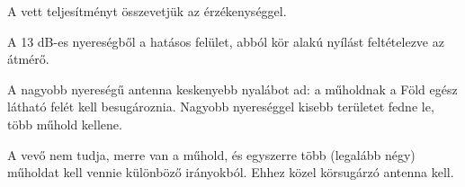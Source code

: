 \begin{center}\end{center}

\begin{center}\end{center}

A vett teljesítményt összevetjük az érzékenységgel.

\begin{center}\end{center}

\begin{center}\end{center}

A 13 dB-es nyereségből a hatásos felület, abból kör alakú nyílást feltételezve az átmérő.

\begin{center}\end{center}

\begin{center}\end{center}

\begin{center}\end{center}

A nagyobb nyereségű antenna keskenyebb nyalábot ad: a műholdnak a Föld egész látható felét kell besugároznia. Nagyobb nyereséggel kisebb területet fedne le, több műhold kellene.

A vevő nem tudja, merre van a műhold, és egyszerre több (legalább négy) műholdat kell vennie különböző irányokból. Ehhez közel körsugárzó antenna kell.
\begin{eredmeny}

\begin{center}\end{center}
\end{eredmeny}
